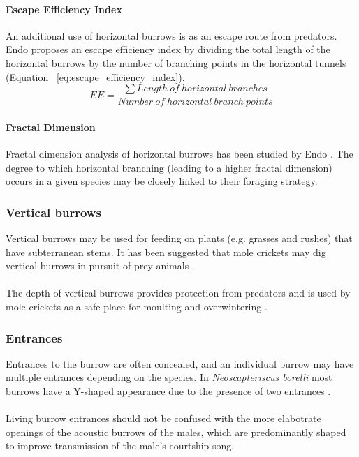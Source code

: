 \documentclass{article}
\begin{document}
   \paragraph{Escape Efficiency Index}
   An additional use of horizontal burrows is as an escape route from predators. Endo \cite{endo2008} proposes an escape efficiency index by dividing the total length of the horizontal burrows by the number of branching points in the horizontal tunnels (Equation ~\ref{eq:escape_efficiency_index}).
   \begin{equation}
   EE = \frac{\sum{Length\ of\ horizontal\ branches}}{Number\ of\ horizontal\ branch\ points}
   \label{eq:escape_efficiency_index}
   \end{equation}
   \paragraph{Fractal Dimension}
   Fractal dimension analysis of horizontal burrows has been studied by Endo \cite{endo2008}. The degree to which horizontal branching (leading to a higher fractal dimension) occurs in a given species may be closely linked to their foraging strategy. 

   \subsubsection{Vertical burrows}
   Vertical burrows may be used for feeding on plants (e.g. grasses and rushes) that have subterranean stems. It has been suggested that mole crickets may dig vertical burrows in pursuit of prey animals \cite{brandenburg2002}.
   \paragraph{}
   The depth of vertical burrows provides protection from predators and is used by mole crickets as a safe place for moulting and overwintering \cite{endo2007}.
   
   \subsubsection{Entrances}
   Entrances to the burrow are often concealed, and an individual burrow may have multiple entrances depending on the species. In \textit{Neoscapteriscus borelli} most burrows have a Y-shaped appearance due to the presence of two entrances \cite{brandenburg2002}.
   \paragraph{}
   Living burrow entrances should not be confused with the more elabotrate openings of the acoustic burrows of the males, which are predominantly shaped to improve transmission of the male's courtship song.
   
\end{document}
